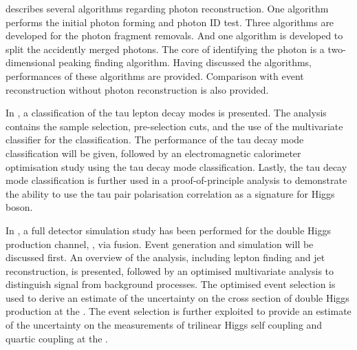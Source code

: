  describes several \pandora algorithms regarding photon reconstruction. One algorithm performs the initial photon forming and photon ID test. Three algorithms are developed for the photon fragment removals. And one algorithm is developed to split the accidently merged photons. The core of identifying the photon is a two-dimensional peaking finding algorithm. Having discussed the algorithms, performances of these algorithms are provided. Comparison with event reconstruction without photon reconstruction is also provided.

In , a classification of the tau lepton decay modes is presented. The analysis contains the sample selection, pre-selection cuts, and the use of the multivariate classifier for the classification.  The performance of the tau decay mode classification will be given, followed by an electromagnetic calorimeter optimisation study using the tau decay mode classification. Lastly, the  tau decay mode classification is further used in a proof-of-principle analysis to demonstrate the ability to use the tau pair polarisation correlation as a signature for Higgs boson.

In , a full \CLICILD detector simulation study has been performed for the double Higgs production channel, \eeToHH, via \WW fusion. Event generation and simulation will be discussed first. An overview of the analysis, including lepton finding and jet reconstruction, is presented, followed by an optimised multivariate analysis to distinguish signal from background processes. The optimised event selection is used to derive an estimate of the uncertainty on the cross section of double Higgs production at the \CLIC. The event selection is further exploited to provide an estimate of the uncertainty on the measurements of  trilinear Higgs self coupling and quartic coupling at the \CLIC.

